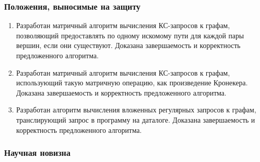 

\subsubsection*{\large{Положения, выносимые на защиту}}
\begin{enumerate}
	\item Разработан матричный алгоритм вычисления КС-запросов к графам, позволяющий предоставлять по одному искомому пути для каждой пары вершин, если они существуют. Доказана завершаемость и корректность предложенного алгоритма.
	\item Разработан матричный алгоритм вычисления КС-запросов к графам, использующий такую матричную операцию, как произведение Кронекера. Доказана завершаемость и корректность предложенного алгоритма.
	\item Разработан алгоритм вычисления вложенных регулярных запросов к графам, транслирующий запрос в программу на даталоге. Доказана завершаемость и корректность предложенного алгоритма.
\end{enumerate}


\subsubsection*{\large{Научная новизна}}

